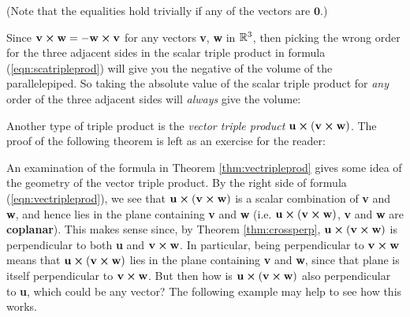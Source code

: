 
\par\noindent(Note that the equalities hold trivially if any of the vectors are $\textbf{0}$.)\smallskip

Since $\textbf{v} \bm{\times} \textbf{w} = -\textbf{w} \bm{\times} \textbf{v}$ for any vectors \textbf{v}, \textbf{w}
in $\mathbb{R}^{3}$, then picking the wrong order for the three adjacent sides in the scalar triple product in formula
(\ref{eqn:scatripleprod}) will give you the negative of the volume of the parallelepiped. So
taking the absolute value of the scalar triple product for \emph{any} order of the three adjacent sides will
\emph{always} give the volume:


Another type of triple product is the \emph{vector triple product}
$\textbf{u} \bm{\times} (\textbf{v} \bm{\times} \textbf{w})$. The proof of the following theorem is left as an
exercise for the reader:

An examination of the formula in Theorem \ref{thm:vectripleprod} gives some idea of the geometry of the vector triple
product. By the right side of formula (\ref{eqn:vectripleprod}), we see that
$\textbf{u} \bm{\times} (\textbf{v} \bm{\times} \textbf{w})$ is a scalar combination of \textbf{v} and \textbf{w}, and
hence lies in the plane containing \textbf{v} and \textbf{w} (i.e.
$\textbf{u} \bm{\times} (\textbf{v} \bm{\times} \textbf{w})$, \textbf{v} and \textbf{w} are
\textbf{coplanar}).
This makes sense since, by Theorem \ref{thm:crossperp},
$\textbf{u} \bm{\times} (\textbf{v} \bm{\times} \textbf{w})$ is perpendicular to both \textbf{u} and
$\textbf{v} \bm{\times} \textbf{w}$. In particular, being perpendicular to $\textbf{v} \bm{\times} \textbf{w}$ means
that $\textbf{u} \bm{\times} (\textbf{v} \bm{\times} \textbf{w})$ lies in the plane containing \textbf{v} and
\textbf{w}, since that plane is itself perpendicular to $\textbf{v} \bm{\times} \textbf{w}$. But then how is
$\textbf{u} \bm{\times} (\textbf{v} \bm{\times} \textbf{w})$ also perpendicular to \textbf{u}, which could be any
vector? The following example may help to see how this works.

